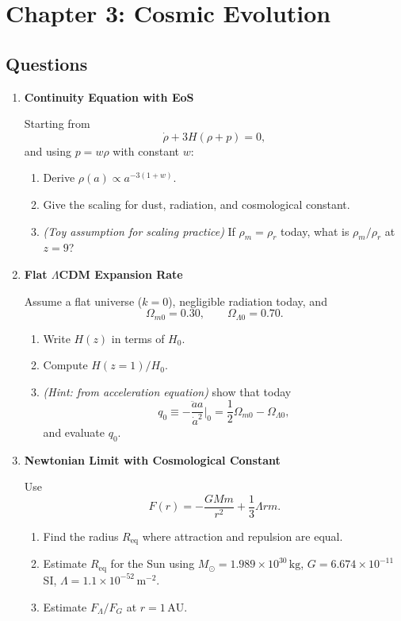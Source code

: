 \clearpage
\section{Chapter 3: Cosmic Evolution}

\subsection{Questions}

\begin{enumerate}[label=3.\arabic*]
  \item \label{q:3.1} \textbf{Continuity Equation with EoS}

  Starting from
  \[
    \dot{\rho}+3H(\rho+p)=0,
  \]
  and using $p=w\rho$ with constant $w$:
  \begin{enumerate}[label=(\alph*)]
    \item Derive $\rho(a)\propto a^{-3(1+w)}$.
    \item Give the scaling for dust, radiation, and cosmological constant.
    \item \textit{(Toy assumption for scaling practice)} If $\rho_m=\rho_r$ today, what is $\rho_m/\rho_r$ at $z=9$?
  \end{enumerate}

  \item \label{q:3.2} \textbf{Flat $\Lambda$CDM Expansion Rate}

  Assume a flat universe ($k=0$), negligible radiation today, and
  \[
    \Omega_{m0}=0.30,\qquad \Omega_{\Lambda0}=0.70.
  \]
  \begin{enumerate}[label=(\alph*)]
    \item Write $H(z)$ in terms of $H_0$.
    \item Compute $H(z=1)/H_0$.
    \item \textit{(Hint: from acceleration equation)} show that today
    \[
      q_0 \equiv -\frac{\ddot a a}{\dot a^2}\Big|_0 = \frac{1}{2}\Omega_{m0}-\Omega_{\Lambda0},
    \]
    and evaluate $q_0$.
  \end{enumerate}

  \item \label{q:3.3} \textbf{Newtonian Limit with Cosmological Constant}

  Use
  \[
    F(r) = -\frac{GMm}{r^2}+\frac{1}{3}\Lambda r m.
  \]
  \begin{enumerate}[label=(\alph*)]
    \item Find the radius $R_\mathrm{eq}$ where attraction and repulsion are equal.
    \item Estimate $R_\mathrm{eq}$ for the Sun using $M_\odot=1.989\times10^{30}\,\mathrm{kg}$,
    $G=6.674\times10^{-11}$ SI,
    $\Lambda=1.1\times10^{-52}\,\mathrm{m^{-2}}$.
    \item Estimate $F_\Lambda/F_G$ at $r=1\,\mathrm{AU}$.
  \end{enumerate}


\end{enumerate}
